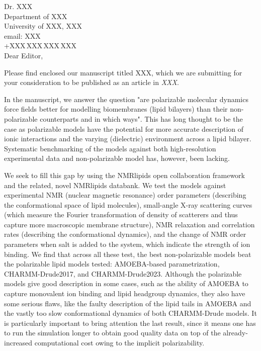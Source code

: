 \documentclass[11pt]{letter}
\begin{document}
\reversemarginpar
\pagestyle{empty}
\noindent Dr. XXX\\
\noindent Department of XXX \\
\noindent University of XXX, XXX \\
\noindent email: XXX\\
\noindent +XXX\,XXX\,XXX\,XXX \\


Dear Editor,

Please find enclosed our manuscript titled
{XXX}, which we are submitting for your consideration to be published as an article in \textit{XXX}.

In the manuscript, we answer the question "are polarizable molecular dynamics force fields better for modelling biomembranes (lipid bilayers) than their non-polarizable counterparts and in which ways". This has long thought to be the case as polarizable models have the potential for more accurate description of ionic interactions and the varying (dielectric) environment across a lipid bilayer. Systematic benchmarking of the models against both high-resolution experimental data and non-polarizable model has, however, been lacking.

We seek to fill this gap by using the NMRlipids open collaboration framework and the related, novel NMRlipids databank. We test the models against experimental NMR (nuclear magnetic resonance) order parameters (describing the conformational space of lipid molecules), small-angle X-ray scattering curves (which measure the Fourier transformation of density of scatterers and thus capture more macroscopic membrane structure), NMR relaxation and correlation rates (describing the conformational dynamics), and the change of NMR order parameters when salt is added to the system, which indicate the strength of ion binding. We find that across all these test, the best non-polarizable models beat the polarizable lipid models tested: AMOEBA-based parametrization, CHARMM-Drude2017, and CHARMM-Drude2023. Although the polarizable models give good description in some cases, such as the ability of AMOEBA to capture monovalent ion binding and lipid headgroup dynamics, they also have some serious flaws, like the faulty description of the lipid tails in AMOEBA and the vastly too slow conformational dynamics of both CHARMM-Drude models. It is particularly important to bring attention the last result, since it means one has to run the simulation longer to obtain good quality data on top of the already-increased computational cost owing to the implicit polarizability.
\end{document}
